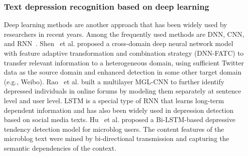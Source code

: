 \subsubsection{Text depression recognition based on deep learning}
\label{sec_fquality}

Deep learning methods are another approach that has been widely used by researchers in recent years. Among the frequently used methods are DNN, CNN, and RNN~\cite{yates2017depression,shen2017depression,orabi2018deep,ive2018hierarchical}.
Shen~\cite{shen2018cross} et al. proposed a cross-domain deep neural network model with feature adaptive transformation and combination strategy (DNN-FATC) to transfer relevant information to a heterogeneous domain, using sufficient Twitter data as the source domain and enhanced detection in some other target domain (e.g., Weibo).
Rao~\cite{rao2020mgl} et al. built a multilayer MGL-CNN to further identify depressed individuals in online forums by modeling them separately at sentence level and user level.
LSTM is a special type of RNN that learns long-term dependent information and has also been widely used in depression detection based on social media texts. Hu~\cite{hu2021depression} et al. proposed a Bi-LSTM-based depressive tendency detection model for microblog users. The content features of the microblog text were mined by bi-directional transmission and capturing the semantic dependencies of the context.

